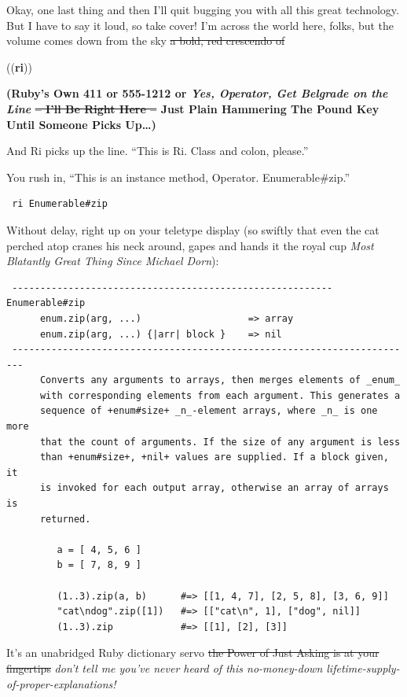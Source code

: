 \documentclass[10pt,twoside]{report}
\begin{document}
Okay, one last thing and then I'll quit bugging you with all this
great technology. But I have to say it loud, so take cover! I'm across
the world here, folks, but the volume comes down from the sky \sout{a
bold, red crescendo of}

\begin{center}
{\Huge{\color{parensaroundricolor}((}\color{ricolor}\textbf{ri}{\color{parensaroundricolor}))}}
\end{center}

{\color{belgradeoperatorcolor}
\bf\large (Ruby's Own 411 or 555-1212 or \emph{Yes, Operator, Get
    Belgrade on the Line} \sout{-- I'll Be Right Here --} Just Plain
  Hammering The Pound Key Until Someone Picks Up\ldots)}

And Ri picks up the line.  ``This is Ri. Class and colon, please.''  

You rush in, ``This is an instance method, Operator. Enumerable\#zip.''

\begin{lstlisting}
 ri Enumerable#zip
\end{lstlisting}

Without delay, right up on your teletype display (so swiftly that even
the cat perched atop cranes his neck around, gapes and hands it the
royal cup \emph{Most Blatantly Great Thing Since Michael Dorn}):

\begin{lstlisting}
 --------------------------------------------------------- Enumerable#zip
      enum.zip(arg, ...)                   => array
      enum.zip(arg, ...) {|arr| block }    => nil
 ------------------------------------------------------------------------
      Converts any arguments to arrays, then merges elements of _enum_
      with corresponding elements from each argument. This generates a
      sequence of +enum#size+ _n_-element arrays, where _n_ is one more
      that the count of arguments. If the size of any argument is less
      than +enum#size+, +nil+ values are supplied. If a block given, it
      is invoked for each output array, otherwise an array of arrays is
      returned.

         a = [ 4, 5, 6 ]
         b = [ 7, 8, 9 ]

         (1..3).zip(a, b)      #=> [[1, 4, 7], [2, 5, 8], [3, 6, 9]]
         "cat\ndog".zip([1])   #=> [["cat\n", 1], ["dog", nil]]
         (1..3).zip            #=> [[1], [2], [3]]
\end{lstlisting}


It's an unabridged Ruby dictionary servo \sout{the Power of Just Asking is
at your fingertips} \emph{don't tell me you've never heard of this
no-money-down lifetime-supply-of-proper-explanations!}
\end{document}
